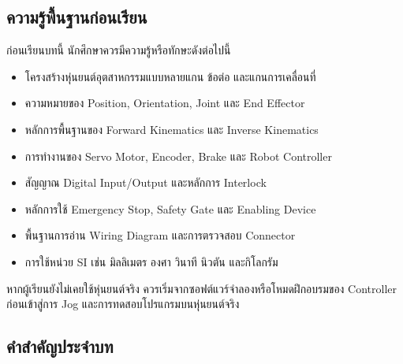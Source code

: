 \subsection{ความรู้พื้นฐานก่อนเรียน}

ก่อนเรียนบทนี้ นักศึกษาควรมีความรู้หรือทักษะดังต่อไปนี้

\begin{itemize}
    \item โครงสร้างหุ่นยนต์อุตสาหกรรมแบบหลายแกน ข้อต่อ และแกนการเคลื่อนที่
    \item ความหมายของ Position, Orientation, Joint และ End Effector
    \item หลักการพื้นฐานของ Forward Kinematics และ Inverse Kinematics
    \item การทำงานของ Servo Motor, Encoder, Brake และ Robot Controller
    \item สัญญาณ Digital Input/Output และหลักการ Interlock
    \item หลักการใช้ Emergency Stop, Safety Gate และ Enabling Device
    \item พื้นฐานการอ่าน Wiring Diagram และการตรวจสอบ Connector
    \item การใช้หน่วย SI เช่น มิลลิเมตร องศา วินาที นิวตัน และกิโลกรัม
\end{itemize}

หากผู้เรียนยังไม่เคยใช้หุ่นยนต์จริง ควรเริ่มจากซอฟต์แวร์จำลองหรือโหมดฝึกอบรมของ Controller ก่อนเข้าสู่การ Jog และการทดสอบโปรแกรมบนหุ่นยนต์จริง

\newpage

\subsection{คำสำคัญประจำบท}


